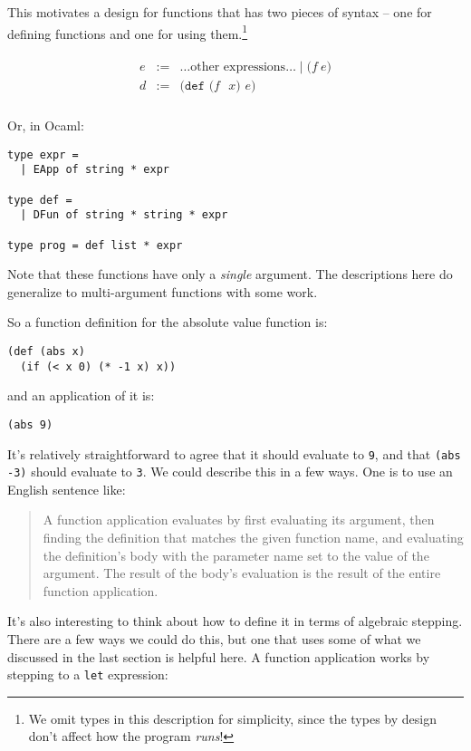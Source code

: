 \documentclass[10pt, oneside]{article}
\begin{document}
This motivates a design for functions that has two pieces of syntax -- one
for defining functions and one for using them.\footnote{We omit types in this
description for simplicity, since the types by design don't affect how the
program \emph{runs}!}

\[
\begin{array}{ll}
\begin{array}{lrl}
e & := & \ldots \textrm{other expressions} \ldots \mid \texttt{($f\ e$)} \\
d & := & \texttt{(def ($f$ $x$) $e$)} \\
\end{array}
\end{array}
\]

Or, in Ocaml:

\begin{lstlisting}
type expr =
  | EApp of string * expr

type def =
  | DFun of string * string * expr

type prog = def list * expr
\end{lstlisting}

Note that these functions have only a \textit{single} argument. The
descriptions here do generalize to multi-argument functions with some work.

So a function definition for the absolute value function is:

\begin{lstlisting}
(def (abs x)
  (if (< x 0) (* -1 x) x))
\end{lstlisting}

and an application of it is:

\begin{lstlisting}
(abs 9)
\end{lstlisting}

It's relatively straightforward to agree that it should evaluate to
\texttt{9}, and that \texttt{(abs -3)} should evaluate to \texttt{3}. We
could describe this in a few ways. One is to use an English sentence like:

\begin{quote} A function application evaluates by first evaluating its
argument, then finding the definition that matches the given function name,
and evaluating the definition's body with the parameter name set to the value
of the argument. The result of the body's evaluation is the result of the
entire function application.\end{quote}

It's also interesting to think about how to define it in terms of algebraic
stepping. There are a few ways we could do this, but one that uses some of
what we discussed in the last section is helpful here. A function application
works by stepping to a \texttt{let} expression:
\end{document}
